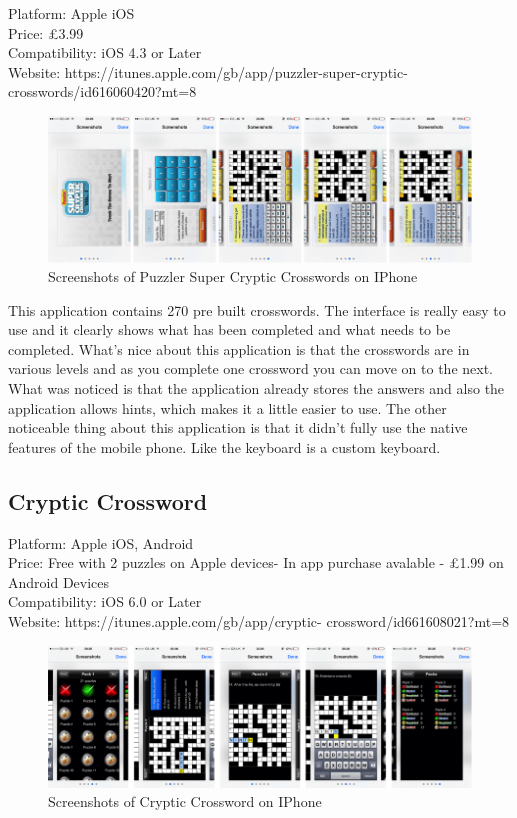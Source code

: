 Platform: Apple iOS \\ Price: \pounds3.99 \\ Compatibility: iOS 4.3 or Later \\
Website: https://itunes.apple.com/gb/app/puzzler-super-cryptic-
crosswords/id616060420?mt=8

\begin{figure}[H]
    \centering
    \includegraphics[width=\linewidth]{pscs.png}
    \caption{Screenshots of Puzzler Super Cryptic Crosswords on IPhone}
\end{figure}

This application contains 270 pre built crosswords. The interface is really easy
to use and it clearly shows what has been completed and what needs to be
completed. What’s nice about this application is that the crosswords are in
various levels and as you complete one crossword you can move on to the next.
What was noticed is that the application already stores the answers and also the
application allows hints, which makes it a little easier to use. The other
noticeable thing about this application is that it didn’t fully use the native
features of the mobile phone. Like the keyboard is a custom keyboard.


\subsection{Cryptic Crossword}

Platform: Apple iOS, Android\\ Price: Free with 2 puzzles on Apple devices- In
app purchase avalable - \pounds1.99 on Android Devices\\ Compatibility: iOS 6.0
or Later\\ Website: https://itunes.apple.com/gb/app/cryptic-
crossword/id661608021?mt=8


\begin{figure}[H]
    \centering
    \includegraphics[width=\linewidth]{cc.png}
    \caption{Screenshots of Cryptic Crossword on IPhone}
\end{figure}

